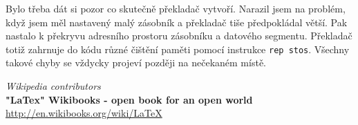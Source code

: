 \documentclass[a4paper,12pt]{article}
\begin{document}
Bylo třeba dát si pozor co skutečně překladač vytvoří. Narazil jsem na problém, když jsem
měl nastavený malý zásobník a překladač tiše předpokládal větší. Pak nastalo k překryvu
adresního prostoru zásobníku a datového segmentu. Překladač totiž zahrnuje do kódu různé
čištění paměti pomocí instrukce \verb+rep stos+. Všechny takové chyby se vždycky projeví
později na nečekaném místě.

\begin{thebibliography}{9}

{\em Wikipedia contributors} \\
{\bf "LaTex" Wikibooks - open book for an open world} \\
\url{http://en.wikibooks.org/wiki/LaTeX} \\

\end{thebibliography}
\end{document}
